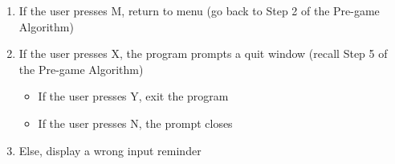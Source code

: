 \begin{enumerate}
\begin{enumerate}[label=\alph*]
            \item If the user presses M, return to menu (go back to Step 2 of the Pre-game Algorithm)
            \item If the user presses X, the program prompts a quit window (recall Step 5 of the Pre-game Algorithm)
                \begin{itemize}[label={}]
                    \item If the user presses Y, exit the program
                    \item If the user presses N, the prompt closes
                \end{itemize}
            \item Else, display a wrong input reminder
        \end{enumerate}
\end{enumerate}
